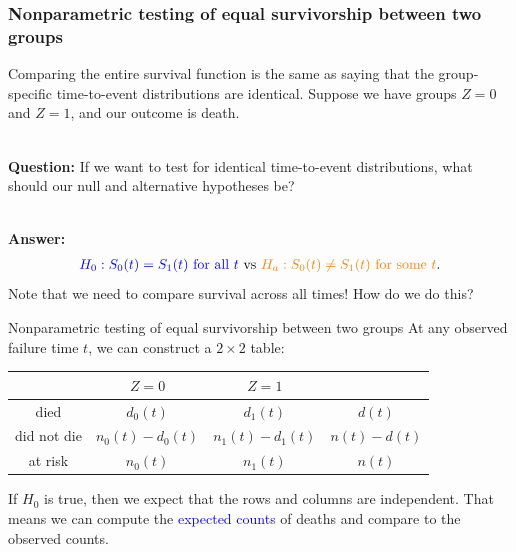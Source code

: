 \documentclass[10pt,t]{beamer}
\begin{document}
\begin{frame}
\frametitle{Nonparametric testing of equal survivorship between two groups}

Comparing the entire survival function is the same as saying that the group-specific time-to-event distributions are identical. Suppose we have groups $Z = 0$ and $Z = 1$, and our outcome is death.
\\ ~\ 

\textbf{Question:} If we want to test for identical time-to-event distributions, what should our null and alternative hypotheses be? \pause 
\\ ~\ 

\textbf{Answer:}
\begin{align*}
\textcolor{blue}{H_0: S_0(t) = S_1(t) \text{ for all } t} \ \text{vs} \ \textcolor{orange}{H_a: S_0(t) \neq S_1(t) \text{ for some }t}.
\end{align*} \pause 
Note that we need to compare survival across all times! How do we do this? 
\end{frame}

\begin{frame}{Nonparametric testing of equal survivorship between two groups}
At any observed failure time $t$, we can construct a $2 \times 2$ table:\vspace{-0.2cm}

\begin{center}
	\begin{tabular}{c|c|c|c}
		& $Z = 0$ & $Z = 1$ \\
		\hline
		died & $d_0(t)$ & $d_1(t)$ & $d(t)$ \\
		did not die & $n_0(t) - d_0(t)$ & $n_1(t) - d_1(t)$ & $n(t) - d(t)$\\
		at risk & $n_0(t)$ & $n_1(t)$ & $n(t)$
	\end{tabular}
\end{center}\vspace{-0.2cm}

If $H_0$ is true, then we expect that the rows and columns are independent. That means we can compute the \textcolor{blue}{expected counts} of deaths and compare to the observed counts.
\end{frame}
\end{document}
